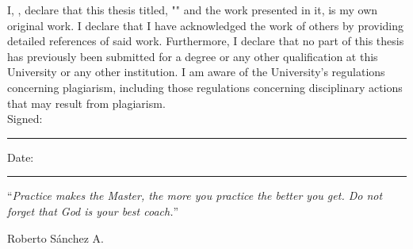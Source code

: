 \documentclass[
11pt, %
english, %
singlespacing, %
headsepline, %
chapterinoneline, %
]{MastersDoctoralThesis} %
\begin{document}

\begin{declaration}
\addchaptertocentry{\authorshipname} %
\noindent I, \authorname, declare that this thesis titled, "\ttitle" and the work presented in it, is my own
original work. I declare that I have acknowledged the work of others by providing detailed
references of said work. Furthermore, I declare that no part of this thesis has previously been
submitted for a degree or any other qualification at this University or any other institution.
I am aware of the University’s regulations concerning plagiarism, including those regulations
concerning disciplinary actions that may result from plagiarism.\\

 
\noindent Signed:\\
\rule[0.5em]{25em}{0.5pt} %
 
\noindent Date:\\
\rule[0.5em]{25em}{0.5pt} %
\end{declaration}

\cleardoublepage


\vspace*{0.2\textheight}

\noindent\enquote{\itshape Practice makes the Master, the more you practice the better you get. Do not forget that God is your best coach.}\bigbreak

\hfill Roberto Sánchez A.

\end{document}
